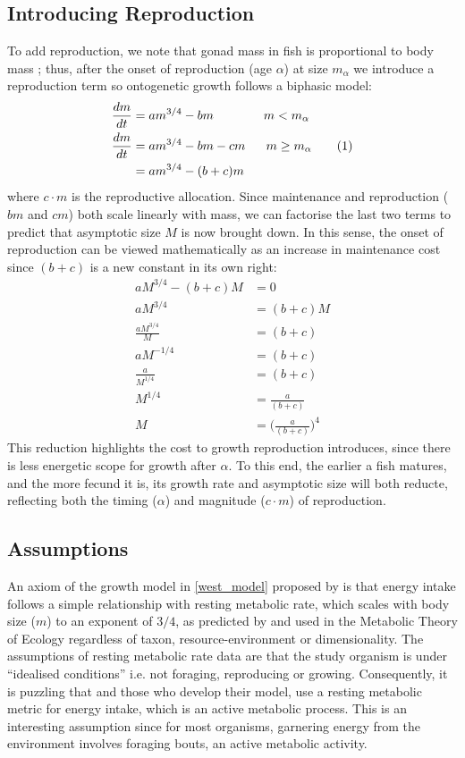 \documentclass[a4paper]{article} %
\newcommand\numberthis{\addtocounter{equation}{1}\tag{\theequation}}
\begin{document}
\subsection{Introducing Reproduction}
To add reproduction, we note that gonad mass in fish is proportional to body mass \autocite{Charnov2001, Roff1983, peters1983, kozlowski1996}; thus, after the onset of reproduction (age $\alpha$) at size $m_{\alpha}$ we introduce a reproduction term so ontogenetic growth follows a biphasic model:
\begin{align*}
    \frac{dm}{dt} &= am^{3/4} - bm \ \ \ \ \ \ \ \ \ \ \ \ m < m_{\alpha} \\
    \frac{dm}{dt} &= am^{3/4} - bm - cm \ \ \ \ \ m \geq m_{\alpha} \numberthis \label{charnov2001} \\
    &= am^{3/4} - (b+c)m
\end{align*}
where $c \cdot m$ is the reproductive allocation. Since maintenance and reproduction ($bm$ and $cm$) both scale linearly with mass, we can factorise the last two terms to predict that asymptotic size $M$ is now brought down. In this sense, the onset of reproduction can be viewed mathematically as an increase in maintenance cost since $(b+c)$ is a new constant in its own right:
\begin{align*}
    aM^{3/4} - (b+c)M &= 0 \\
    aM^{3/4} &= (b+c)M \\
    \frac{aM^{3/4}}{M} &= (b+c) \\
    aM^{-1/4} &= (b+c) \\
    \frac{a}{M^{1/4}} &= (b+c) \\
    M^{1/4} &= \frac{a}{(b+c)} \\
    M &= \Bigg(\frac{a}{(b+c)}\Bigg)^4
\end{align*}
This reduction highlights the cost to growth reproduction introduces, since there is less energetic scope for growth after $\alpha$. To this end, the earlier a fish matures, and the more fecund it is, its growth rate and asymptotic size will both reducte, reflecting both the timing ($\alpha$) and magnitude ($c\cdot{m}$) of reproduction.

\subsection{Assumptions}
An axiom of the growth model in \eqref{west_model} proposed by \cite{West2001} is that energy intake follows a simple relationship with resting metabolic rate, which scales with body size ($m$) to an exponent of $3/4$, as predicted by \cite{West1997} and used in the Metabolic Theory of Ecology \autocite{Brown2004} regardless of taxon, resource-environment or dimensionality. The assumptions of resting metabolic rate data are that the study organism is under ``idealised conditions'' i.e. not foraging, reproducing or growing. Consequently, it is puzzling that \cite{West2001} and those who develop their model, use a resting metabolic metric for energy intake, which is an active metabolic process. This is an interesting assumption since for most organisms, garnering energy from the environment involves foraging bouts, an active metabolic activity. 
\end{document}
